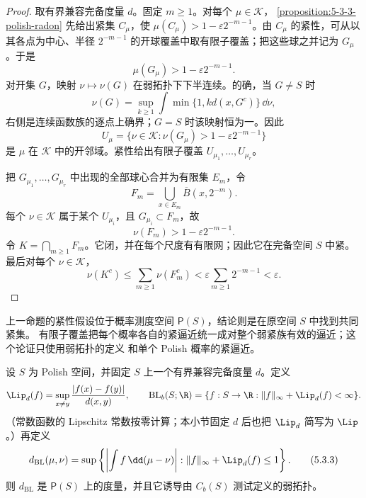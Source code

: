 \begin{proof}
取有界兼容完备度量 $d$。固定 $m\ge1$。对每个 $\mu\in\mathcal K$，
\cref{proposition:5-3-3-polish-radon} 先给出紧集 $C_\mu$，使
$\mu(C_\mu)>1-\varepsilon2^{-m-1}$。由 $C_\mu$ 的紧性，可从以其各点为中心、半径
$2^{-m-1}$ 的开球覆盖中取有限子覆盖；把这些球之并记为 $G_\mu$。于是
\[
 \mu(G_\mu)>1-\varepsilon2^{-m-1}.
\]
对开集 $G$，映射 $\nu\mapsto\nu(G)$ 在弱拓扑下下半连续。的确，当 $G\ne S$ 时
\[
 \nu(G)=\sup_{k\ge1}\int\min\{1,kd(x,G^c)\}\,\dd\nu,
\]
右侧是连续函数族的逐点上确界；$G=S$ 时该映射恒为一。因此
\[
 U_\mu=\{\nu\in\mathcal K:\nu(G_\mu)>1-\varepsilon2^{-m-1}\}
\]
是 $\mu$ 在 $\mathcal K$ 中的开邻域。紧性给出有限子覆盖
$U_{\mu_1},\ldots,U_{\mu_r}$。

把 $G_{\mu_1},\ldots,G_{\mu_r}$ 中出现的全部球心合并为有限集 $E_m$，令
\[
 F_m=\bigcup_{x\in E_m}\overline B(x,2^{-m}).
\]
每个 $\nu\in\mathcal K$ 属于某个 $U_{\mu_i}$，且 $G_{\mu_i}\subset F_m$，故
\[
 \nu(F_m)>1-\varepsilon2^{-m-1}.
\]
令 $K=\bigcap_{m\ge1}F_m$。它闭，并在每个尺度有有限网；因此它在完备空间 $S$ 中紧。最后对每个
$\nu\in\mathcal K$，
\[
 \nu(K^c)\le\sum_{m\ge1}\nu(F_m^c)
 <\varepsilon\sum_{m\ge1}2^{-m-1}<\varepsilon.
\]
\end{proof}

\begin{remark}[弱紧性与一致紧逼近]\label{rem:5-3-3-compact-tight-no-loop}
上一命题的紧性假设位于概率测度空间 $\mathsf P(S)$，结论则是在原空间 $S$ 中找到共同紧集。
有限子覆盖把每个概率各自的紧逼近统一成对整个弱紧族有效的逼近；这个论证只使用弱拓扑的定义
和单个 Polish 概率的紧逼近。
\end{remark}

\begin{proposition}\label{proposition:5-3-3-weak-metric}
设 $S$ 为 Polish 空间，并固定 $S$ 上一个有界兼容完备度量 $d$。定义
\[
 \Lip_d(f)=\sup_{x\ne y}\frac{|f(x)-f(y)|}{d(x,y)},
 \qquad
 \mathrm{BL}_b(S;\R)=\{f:S\to\R:\|f\|_\infty+\Lip_d(f)<\infty\}.
\]
（常数函数的 Lipschitz 常数按零计算；本小节固定 $d$ 后也把 $\Lip_d$ 简写为
$\Lip$。）再定义
\[
 d_{\mathrm{BL}}(\mu,\nu)=
 \sup\left\{
 \left|\int f\,\dd(\mu-\nu)\right|:
 \|f\|_\infty+\Lip_d(f)\le1
 \right\}.
 \tag{5.3.3}\label{eq:5-3-bl-metric}
\]
则 $d_{\mathrm{BL}}$ 是 $\mathsf P(S)$ 上的度量，并且它诱导由 $C_b(S)$ 测试定义的弱拓扑。
\end{proposition}

